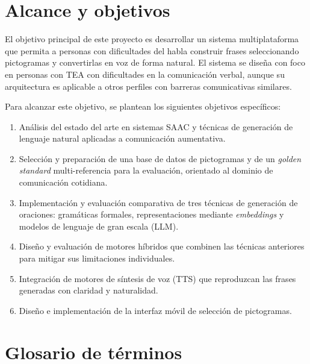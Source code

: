 \section{Alcance y objetivos}

El objetivo principal de este proyecto es desarrollar un sistema multiplataforma que permita a personas con dificultades del habla construir frases seleccionando pictogramas y convertirlas en voz de forma natural. El sistema se diseña con foco en personas con TEA con dificultades en la comunicación verbal, aunque su arquitectura es aplicable a otros perfiles con barreras comunicativas similares.

Para alcanzar este objetivo, se plantean los siguientes objetivos específicos:

\begin{enumerate}
    \item Análisis del estado del arte en sistemas SAAC y técnicas de generación de lenguaje natural aplicadas a comunicación aumentativa.
    \item Selección y preparación de una base de datos de pictogramas y de un \textit{golden standard} multi-referencia para la evaluación, orientado al dominio de comunicación cotidiana.
    \item Implementación y evaluación comparativa de tres técnicas de generación de oraciones: gramáticas formales, representaciones mediante \textit{embeddings} y modelos de lenguaje de gran escala (LLM).
    \item Diseño y evaluación de motores híbridos que combinen las técnicas anteriores para mitigar sus limitaciones individuales.
    \item Integración de motores de síntesis de voz (TTS) que reproduzcan las frases generadas con claridad y naturalidad.
    \item Diseño e implementación de la interfaz móvil de selección de pictogramas.
\end{enumerate}

\section{Glosario de términos}

